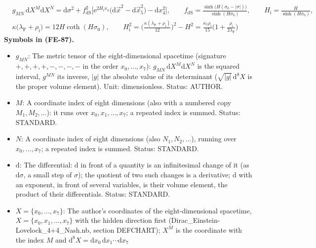 \documentclass[
  10pt,
]{article}
\providecommand{\tightlist}{%
  \setlength{\itemsep}{0pt}\setlength{\parskip}{0pt}}
\begin{document}
\[
\begin{aligned}
&g_{MN}\,\mathrm{d}X^M\mathrm{d}X^N = \mathrm{d}\sigma^2 + f_{\mathrm{dS}}^2\Big[\mathrm{e}^{2H_{\mathrm{i}}x_4}\big(\mathrm{d}\vec x^2 - \mathrm{d}\vec x_5^2\big) - \mathrm{d}x_4^2\Big],\qquad
 f_{\mathrm{dS}} = \frac{\sinh\big(H(\sigma_0 - \lvert\sigma\rvert)\big)}{\sinh(H\sigma_0)},\qquad H_{\mathrm{i}} = \frac{H}{\sinh(H\sigma_0)},\\
&\kappa\big(\lambda_{\mathrm{F}} + \rho_{\mathrm{i}}\big) = 12H\coth(H\sigma_0),\qquad
 H_{\mathrm{i}}^2 = \Big(\frac{\kappa(\lambda_{\mathrm{F}} + \rho_{\mathrm{i}})}{12}\Big)^2 - H^2 = \frac{\kappa_7\rho_{\mathrm{i}}}{15}\Big(1 + \frac{\rho_{\mathrm{i}}}{2\lambda_{\mathrm{F}}}\Big)
\end{aligned} \tag{FE-87}
\] \textbf{Symbols in (FE-87).}

\begin{itemize}
\tightlist
\item
  \(g_{MN}\): The metric tensor of the eight-dimensional spacetime
  (signature \(+,+,+,+,-,-,-,-\) in the order \(x_0, \dots, x_7\)):
  \(g_{MN}\,\mathrm{d}X^M\mathrm{d}X^N\) is the squared interval,
  \(g^{MN}\) its inverse, \(\lvert g\rvert\) the absolute value of its
  determinant (\(\sqrt{\lvert g\rvert}\,\mathrm{d}^8X\) is the proper
  volume element). Unit: dimensionless. Status: AUTHOR.
\item
  \(M\): A coordinate index of eight dimensions (also with a numbered
  copy \(M_1, M_2, \dots\)): it runs over \(x_0, x_1, \dots, x_7\); a
  repeated index is summed. Status: STANDARD.
\item
  \(N\): A coordinate index of eight dimensions (also
  \(N_1, N_2, \dots\)), running over \(x_0, \dots, x_7\); a repeated
  index is summed. Status: STANDARD.
\item
  \(\mathrm{d}\): The differential: \(\mathrm{d}\) in front of a
  quantity is an infinitesimal change of it (as \(\mathrm{d}\sigma\), a
  small step of \(\sigma\)); the quotient of two such changes is a
  derivative; \(\mathrm{d}\) with an exponent, in front of several
  variables, is their volume element, the product of their
  differentials. Status: STANDARD.
\item
  \(X = \{x_0, \dots, x_7\}\): The author's coordinates of the
  eight-dimensional spacetime, \(X = \{x_0, x_1, \dots, x_7\}\) with the
  hidden direction first (Dirac\_Einstein-Lovelock\_4+4\_Nash.nb,
  section DEFCHART); \(X^M\) is the coordinate with the index \(M\) and
  \(\mathrm{d}^8X = \mathrm{d}x_0\,\mathrm{d}x_1\cdots\mathrm{d}x_7\)

\end{itemize}
\end{document}

